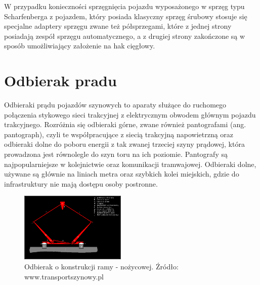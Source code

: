 W przypadku konieczności sprzęgnięcia pojazdu wyposażonego w sprzęg typu Scharfenberga z pojazdem, który posiada klasyczny sprzęg śrubowy stosuje się specjalne adaptery sprzęgu zwane też półsprzegami, które z jednej strony posiadają
zespół sprzęgu automatycznego, a z drugiej strony zakończone są w sposób umożliwiający założenie na hak cięgłowy.

\section{Odbierak pradu}
Odbieraki prądu pojazdów szynowych to aparaty służące do ruchomego połączenia stykowego sieci trakcyjnej z elektrycznym obwodem głównym pojazdu trakcyjnego. Rozróżnia się odbieraki górne, zwane również pantografami (ang. pantograph), czyli te współpracujące z siecią trakcyjną napowietrzną oraz odbieraki dolne do poboru energii z tak zwanej trzeciej szyny prądowej, która prowadzona jest równolegle do szyn toru na ich poziomie. 
Pantografy są najpopularniejsze w kolejnictwie oraz komunikacji tramwajowej. Odbieraki dolne, używane są głównie na liniach metra oraz szybkich kolei miejskich, gdzie do infrastruktury nie mają dostępu osoby postronne. 

\begin{figure}
	\includegraphics[width=0.45\textwidth]{skryptkierownik-img/kolodbierakschem1.png}
	\caption{Odbierak o konstrukcji ramy - nożycowej. Źródło: www.transportszynowy.pl}
	\label{fig:pantograf1}
\end{figure}

